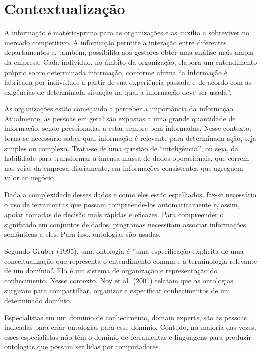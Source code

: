 \section{Contextualização}
\label{Contextualization}

A informação é matéria-prima para as organizações e as auxilia a sobreviver no mercado competitivo. A informação permite a interação entre diferentes departamentos e, também, possibilita aos gestores obter uma análise mais ampla da empresa. Cada indivíduo, no âmbito da organização, elabora um entendimento próprio sobre determinada informação, conforme afirma \cite{Choo2003} “a informação é fabricada por indivíduos a partir de sua experiência passada e de acordo com as exigências de determinada situação na qual a informação deve ser usada”.

As organizações estão começando a perceber a importância da informação. Atualmente, as pessoas em geral são expostas a uma grande quantidade de informação, sendo pressionadas a estar sempre bem informadas. Nesse contexto, torna-se necessário saber qual informação é relevante para determinada ação, seja simples ou complexa. Trata-se de uma questão de “inteligência”, ou seja, da habilidade para transformar a imensa massa de dados operacionais, que correm nas veias da empresa diariamente, em informações consistentes que agreguem valor ao negócio \cite{Teixeira2000}.

Dada a complexidade desses dados e como eles estão espalhados, faz-se necessário o uso de ferramentas que possam compreende-los automaticamente e, assim, apoiar tomadas de decisão mais rápidas e eficazes. Para compreender o significado em conjuntos de dados, programas necessitam associar informações semânticas a eles. Para isso, ontologias são usadas.

 Segundo Gruber (1995), uma ontologia é ”uma especificação explícita de uma conceitualização que representa o entendimento comum e a terminologia relevante de um domínio”. Ela é um sistema de organização e representação do conhecimento. Nesse contexto, Noy et al. (2001) relatam que as ontologias surgiram para compartilhar, organizar e especificar conhecimentos de um determinado domínio.
 
 Especialistas em um domínio de conhecimento, domain experts, são as pessoas indicadas para criar ontologias para esse domínio. Contudo, na maioria das vezes, esses especialistas não têm o domínio de ferramentas e linguagens para produzir ontologias que possam ser lidas por computadores.


